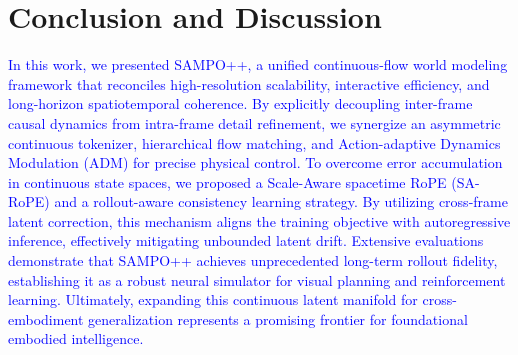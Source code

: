 \section{Conclusion and Discussion}
\label{Sec5:Conclusion}

\textcolor{blue}{In this work, we presented SAMPO++, a unified continuous-flow world modeling framework that reconciles high-resolution scalability, interactive efficiency, and long-horizon spatiotemporal coherence. 
By explicitly decoupling inter-frame causal dynamics from intra-frame detail refinement, we synergize an asymmetric continuous tokenizer, hierarchical flow matching, and Action-adaptive Dynamics Modulation (ADM) for precise physical control.
To overcome error accumulation in continuous state spaces, we proposed a Scale-Aware spacetime RoPE (SA-RoPE) and a rollout-aware consistency learning strategy. By utilizing cross-frame latent correction, this mechanism aligns the training objective with autoregressive inference, effectively mitigating unbounded latent drift. 
Extensive evaluations demonstrate that SAMPO++ achieves unprecedented long-term rollout fidelity, establishing it as a robust neural simulator for visual planning and reinforcement learning.
Ultimately, expanding this continuous latent manifold for cross-embodiment generalization represents a promising frontier for foundational embodied intelligence.}



\newpage
